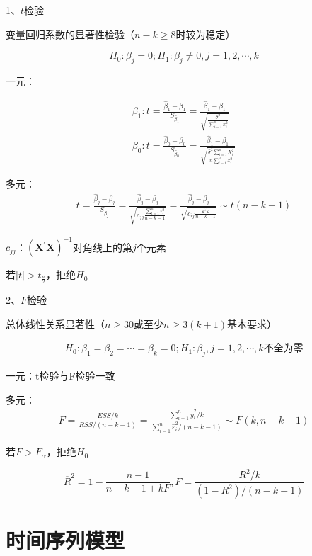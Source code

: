 \documentclass[12pt]{book}
\begin{document}
1、$t$检验

变量回归系数的显著性检验（$n-k\geq 8$时较为稳定）

$$
H_0:\beta_j=0; H_1:\beta_j\neq 0, j=1,2,\cdots,k
$$

一元：

\begin{gather*}
\beta_1:
t
=\frac{\hat{\beta}_1-\beta_1}{S_{\hat{\beta}_1}} 
=\frac{\hat{\beta}_1-\beta_1}{\sqrt{\frac{\hat{\sigma}^2}{\sum_{i=1}^{n}{x_i^2}}}}\\
\beta_0: 
t
=\frac{\hat{\beta}_0-\beta_0}{S_{\hat{\beta}_0}} 
=\frac{\hat{\beta}_1-\beta_1}{\sqrt{\frac{\hat{\sigma}^2\sum_{i=1}^{n}{X_i^2}}{n \sum_{i=1}^{n}{x_i^2}}}}
\end{gather*}


多元：
\begin{gather*}
    t=\frac{\hat{\beta}_j-\beta_j}{S_{\hat{\beta}_j}} =\frac{\hat{\beta}_j-\beta_j}{\sqrt{c_{jj}\frac{\sum_{i=1}^{n}{\varepsilon_i^2}}{n -k-1}}} =\frac{\hat{\beta}_j-\beta_j}{\sqrt{c_{ij}\frac{\bm{\hat{\varepsilon}}' \bm{ \hat{\varepsilon}}}{n -k-1}}} \sim t(n-k-1)
\end{gather*}


$c_{jj}$：$\left(\bm{X}^\prime\bm{X}\right)^{-1}$对角线上的第$j$个元素

若$\left|t\right|>t_{\frac{a}{2}}$，拒绝$H_0$

2、$F$检验

总体线性关系显著性（$n\geq 30$或至少$n\geq3\left(k+1\right)$基本要求）

\begin{gather*}
    H_0:\beta_1=\beta_2=\cdots=\beta_k=0;H_1:\beta_{j}, j=1,2,\cdots,k\text{不全为零}
\end{gather*}


一元：t检验与F检验一致

多元：
\begin{gather*}
F=\frac{ESS/k}{RSS/(n-k-1)} = \frac{\sum_{i=1}^{n}{\hat{y}_i^2/k}}{\sum_{i=1}^{n}{\hat{\varepsilon}_i^2/(n-k-1)}}\sim F(k,n-k-1)
\end{gather*}


若$F>F_\alpha$，拒绝$H_0$

$$
{\overline{R}}^2=1-\frac{n-1}{n-k-1+kF}, F=\frac{R^2/k}{(1-R^2)/(n-k-1)}
$$












\section{时间序列模型}
\end{document}
